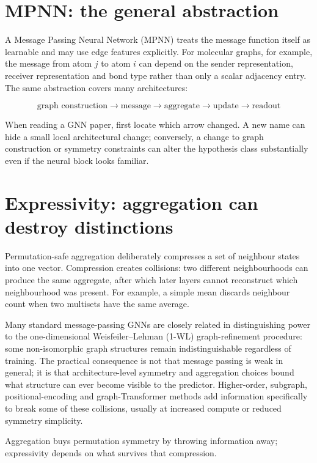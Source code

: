 \section{MPNN: the general abstraction}
A Message Passing Neural Network (MPNN) treats the message function itself as learnable and may use edge features explicitly.
For molecular graphs, for example, the message from atom $j$ to atom $i$ can depend on the sender representation, receiver representation and bond type rather than only a scalar adjacency entry.
The same abstraction covers many architectures:

\[
\boxed{
\text{graph construction}
\rightarrow
\text{message}
\rightarrow
\text{aggregate}
\rightarrow
\text{update}
\rightarrow
\text{readout}
}
\]

When reading a GNN paper, first locate which arrow changed.
A new name can hide a small local architectural change; conversely, a change to graph construction or symmetry constraints can alter the hypothesis class substantially even if the neural block looks familiar.

\section{Expressivity: aggregation can destroy distinctions}
Permutation-safe aggregation deliberately compresses a set of neighbour states into one vector.
Compression creates collisions: two different neighbourhoods can produce the same aggregate, after which later layers cannot reconstruct which neighbourhood was present.
For example, a simple mean discards neighbour count when two multisets have the same average.

Many standard message-passing GNNs are closely related in distinguishing power to the one-dimensional Weisfeiler--Lehman (1-WL) graph-refinement procedure: some non-isomorphic graph structures remain indistinguishable regardless of training.
The practical consequence is not that message passing is weak in general; it is that architecture-level symmetry and aggregation choices bound what structure can ever become visible to the predictor.
Higher-order, subgraph, positional-encoding and graph-Transformer methods add information specifically to break some of these collisions, usually at increased compute or reduced symmetry simplicity.

\begin{calloutintuition}
Aggregation buys permutation symmetry by throwing information away; expressivity depends on what survives that compression.
\end{calloutintuition}

